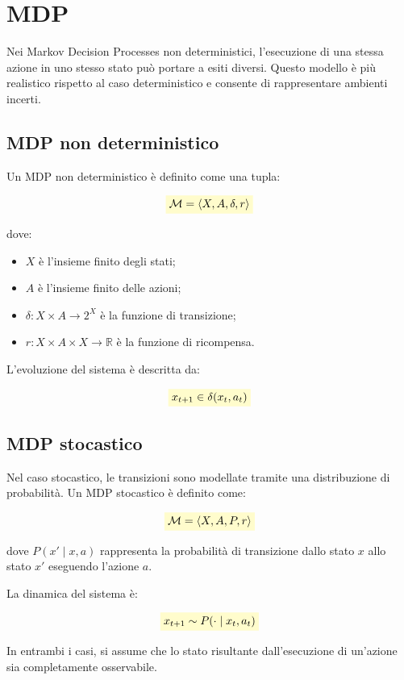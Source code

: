 \documentclass[a4paper,12pt]{report}
\newcommand{\highlight}[1]{%
\colorbox{yellow!20}{$\displaystyle #1$}%
}
\begin{document}
\section{MDP}

Nei Markov Decision Processes non deterministici, l'esecuzione di una stessa
azione in uno stesso stato può portare a esiti diversi. Questo modello è più
realistico rispetto al caso deterministico e consente di rappresentare
ambienti incerti.

\subsection{MDP non deterministico}

Un MDP non deterministico è definito come una tupla:

\[
\highlight{
\mathcal{M} = \langle X, A, \delta, r \rangle}
\]

dove:
\begin{itemize}
    \item $X$ è l'insieme finito degli stati;
    \item $A$ è l'insieme finito delle azioni;
    \item $\delta : X \times A \rightarrow 2^X$ è la funzione di transizione;
    \item $r : X \times A \times X \rightarrow \mathbb{R}$ è la funzione di ricompensa.
\end{itemize}

L'evoluzione del sistema è descritta da:

\[
\highlight{
x_{t+1} \in \delta(x_t, a_t)}
\]

\subsection{MDP stocastico}

Nel caso stocastico, le transizioni sono modellate tramite una distribuzione
di probabilità. Un MDP stocastico è definito come:

\[
\highlight{
\mathcal{M} = \langle X, A, P, r \rangle}
\]

dove $P(x' \mid x, a)$ rappresenta la probabilità di transizione dallo stato
$x$ allo stato $x'$ eseguendo l'azione $a$.

La dinamica del sistema è:

\[
\highlight{
x_{t+1} \sim P(\cdot \mid x_t, a_t)}
\]

In entrambi i casi, si assume che lo stato risultante dall'esecuzione di
un'azione sia completamente osservabile.
\end{document}
